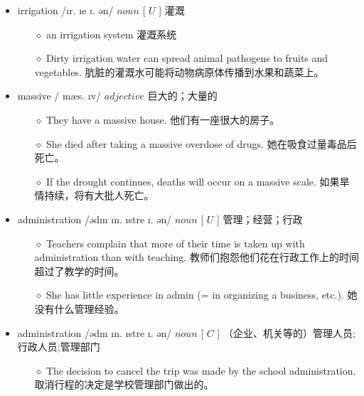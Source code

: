 \documentclass[a4paper,top=2.5cm,buttom=2.5cm10.5pt]{book}
\begin{document}
\begin{itemize}
\item irrigation /\textsecstress  \i r. \i  \textprimstress  \textscriptg e \i . \textesh ən/ $ noun $ [  $ U $  ] 灌溉
\begin{itemize}
\item[$\diamond$] an irrigation system
灌溉系统
\item[$\diamond$] Dirty irrigation water can spread animal pathogens to fruits and vegetables.
肮脏的灌溉水可能将动物病原体传播到水果和蔬菜上。
\end{itemize}
\end{itemize}
\begin{itemize}
\item massive / \textprimstress mæs. \i v/ $ adjective $  巨大的；大量的
\begin{itemize}
\item[$\diamond$] They have a massive house.
他们有一座很大的房子。
\item[$\diamond$] She died after taking a massive overdose of drugs.
她在吸食过量毒品后死亡。
\item[$\diamond$] If the drought continues, deaths will occur on a massive scale.
如果旱情持续，将有大批人死亡。
\end{itemize}
\end{itemize}
\begin{itemize}
\item administration /əd\textsecstress m \i n. \i  \textprimstress stre \i . \textesh ən/ $ noun $ [  $ U $  ] 管理；经营；行政
\begin{itemize}
\item[$\diamond$] Teachers complain that more of their time is taken up with administration than with teaching.
教师们抱怨他们花在行政工作上的时间超过了教学的时间。
\item[$\diamond$] She has little experience in admin (= in organizing a business, etc.).
她没有什么管理经验。
\end{itemize}
\end{itemize}
\begin{itemize}
\item administration /əd\textsecstress m \i n. \i  \textprimstress stre \i . \textesh ən/ $ noun $ [  $ C $  ] （企业、机关等的）管理人员;行政人员;管理部门
\begin{itemize}
\item[$\diamond$] The decision to cancel the trip was made by the school administration.
取消行程的决定是学校管理部门做出的。
\end{itemize}
\end{itemize}
\end{document}
